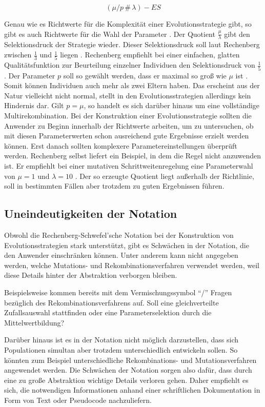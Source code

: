 \begin{equation}
\label{eqn:opt_parameter}
(\mu/p\,\#\,\lambda)-ES
\end{equation}

Genau wie es Richtwerte für die Komplexität einer Evolutionsstrategie gibt, so gibt es auch Richtwerte für die Wahl der Parameter \cite[S.166]{schoeneburg}.
Der Quotient $\frac{\mu}{\lambda}$ gibt den Selektionsdruck der Strategie wieder. Dieser Selektionsdruck soll laut Rechenberg zwischen $\frac{1}{3}$ und $\frac{1}{5}$ liegen  \cite[S.166]{schoeneburg}. Rechenberg empfiehlt bei einer einfachen, glatten Qualitätsfunktion zur Beurteilung einzelner Individuen den Selektionsdruck von $\frac{1}{5}$  \cite[S.166]{schoeneburg}.
Der Parameter $p$ soll so gewählt werden, dass er maximal so groß wie $\mu$ ist \cite[S.166]{schoeneburg}. Somit können Individuen auch mehr als zwei Eltern haben. Das erscheint aus der Natur vielleicht nicht normal, stellt in den Evolutionsstrategien allerdings kein Hindernis dar. Gilt $p = \mu$, so handelt es sich darüber hinaus um eine vollständige Multirekombination.
Bei der Konstruktion einer Evolutionsstrategie sollten die Anwender zu Beginn innerhalb der Richtwerte arbeiten, um zu untersuchen, ob mit diesen Parameterwerten schon ausreichend gute Ergebnisse erzielt werden können. Erst danach sollten komplexere Parametereinstellungen überprüft werden.
Rechenberg selbst liefert ein Beispiel, in dem die Regel nicht anzuwenden ist. Er empfiehlt bei einer mutativen Schrittweitenregelung eine Parameterwahl von $\mu = 1$ und $\lambda = 10$ \cite[S.166]{schoeneburg}. Der so erzeugte Quotient liegt außerhalb der Richtlinie, soll in bestimmten Fällen aber trotzdem zu guten Ergebnissen führen.

\subsection{Uneindeutigkeiten der Notation}

Obwohl die Rechenberg-Schwefel'sche Notation bei der Konstruktion von Evolutionsstrategien stark unterstützt, gibt es Schwächen in der Notation, die den Anwender einschränken können.
Unter anderem kann nicht angegeben werden, welche Mutations- und Rekombinationsverfahren verwendet werden, weil diese Details hinter der Abstraktion verborgen bleiben.

Beispielsweise kommen bereits mit dem Vermischungssymbol \enquote{/} Fragen bezüglich des Rekombinationsverfahrens auf.
Soll eine gleichverteilte Zufallsauswahl stattfinden oder eine Parameterselektion durch die Mittelwertbildung?

Darüber hinaus ist es in der Notation nicht möglich darzustellen, dass sich Populationen simultan aber trotzdem unterschiedlich entwickeln sollen. So könnten zum Beispiel unterschiedliche Rekombinations- und Mutationsverfahren angewendet werden.
Die Schwächen der Notation sorgen also dafür, dass durch eine zu große Abstraktion wichtige Details verloren gehen. 
Daher empfiehlt es sich, die notwendigen Informationen anhand einer schriftlichen Dokumentation in Form von Text oder Pseudocode nachzuliefern.
